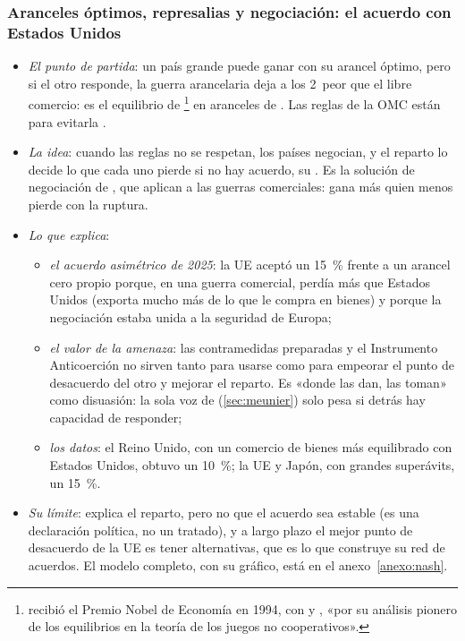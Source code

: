 \documentclass[11pt]{article}
\begin{document}
\subsubsection{Aranceles óptimos, represalias y negociación:\cortetitulo{} el acuerdo con Estados Unidos}\label{sec:negociacion-modelo}

\begin{itemize}
\item \emph{El punto de partida}: un país grande puede ganar con su arancel óptimo, pero si el otro responde, la guerra arancelaria deja a los 2~peor que el libre comercio: es el equilibrio de \footnote{ recibió el Premio Nobel de Economía en 1994, con  y , «por su análisis pionero de los equilibrios en la teoría de los juegos no cooperativos»\nocite{Nobel1994Nash}.} en aranceles de \textcite{Johnson1953Optimum}  . Las reglas de la OMC están para evitarla .
\item \emph{La idea}: cuando las reglas no se respetan, los países negocian, y el reparto lo decide lo que cada uno pierde si no hay acuerdo, su . Es la solución de negociación de \textcite{Nash1950Bargaining}, que \textcite{GrossmanHelpman1995TradeWars} aplican a las guerras comerciales: gana más quien menos pierde con la ruptura.
\item \emph{Lo que explica}:
  \begin{itemize}
  \item \emph{el acuerdo asimétrico de 2025}: la UE aceptó un 15~\% frente a un arancel cero propio porque, en una guerra comercial, perdía más que Estados Unidos (exporta mucho más de lo que le compra en bienes) y porque la negociación estaba unida a la seguridad de Europa;
  \item \emph{el valor de la amenaza}: las contramedidas preparadas y el Instrumento Anticoerción no sirven tanto para usarse como para empeorar el punto de desacuerdo del otro y mejorar el reparto. Es «donde las dan, las toman» como disuasión: la sola voz de  (\ref{sec:meunier}) solo pesa si detrás hay capacidad de responder;
  \item \emph{los datos}: el Reino Unido, con un comercio de bienes más equilibrado con Estados Unidos, obtuvo un 10~\%; la UE y Japón, con grandes superávits, un 15~\%.
  \end{itemize}
\item \emph{Su límite}: explica el reparto, pero no que el acuerdo sea estable (es una declaración política, no un tratado), y a largo plazo el mejor punto de desacuerdo de la UE es tener alternativas, que es lo que construye su red de acuerdos. El modelo completo, con su gráfico, está en el anexo~\ref{anexo:nash}.
\end{itemize}
\end{document}
